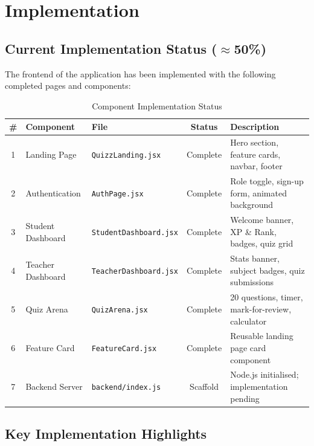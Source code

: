 \documentclass[12pt,a4paper]{article}
\newcommand{\yes}{\textcolor{accent}{\ding{51}}}   %
\newcommand{\no}{\textcolor{red}{\ding{55}}}        %
\begin{document}
\section{Implementation}

\subsection{Current Implementation Status ($\approx$50\%)}

The frontend of the application has been implemented with the following
completed pages and components:

\begin{table}[H]
  \centering
  \caption{Component Implementation Status}
  \small
  \begin{tabularx}{\linewidth}{@{} c l l c X @{}}
    \toprule
    \textbf{\#} & \textbf{Component} & \textbf{File} & \textbf{Status} & \textbf{Description} \\
    \midrule
    1 & Landing Page       & \texttt{QuizzLanding.jsx}     & \yes Complete & Hero section, feature cards, navbar, footer \\
    2 & Authentication     & \texttt{AuthPage.jsx}         & \yes Complete & Role toggle, sign-up form, animated background \\
    3 & Student Dashboard  & \texttt{StudentDashboard.jsx} & \yes Complete & Welcome banner, XP \& Rank, badges, quiz grid \\
    4 & Teacher Dashboard  & \texttt{TeacherDashboard.jsx} & \yes Complete & Stats banner, subject badges, quiz submissions \\
    5 & Quiz Arena         & \texttt{QuizArena.jsx}        & \yes Complete & 20 questions, timer, mark-for-review, calculator \\
    6 & Feature Card       & \texttt{FeatureCard.jsx}      & \yes Complete & Reusable landing page card component \\
    7 & Backend Server     & \texttt{backend/index.js}     & \no Scaffold  & Node.js initialised; implementation pending \\
    \bottomrule
  \end{tabularx}
\end{table}

\subsection{Key Implementation Highlights}
\end{document}
